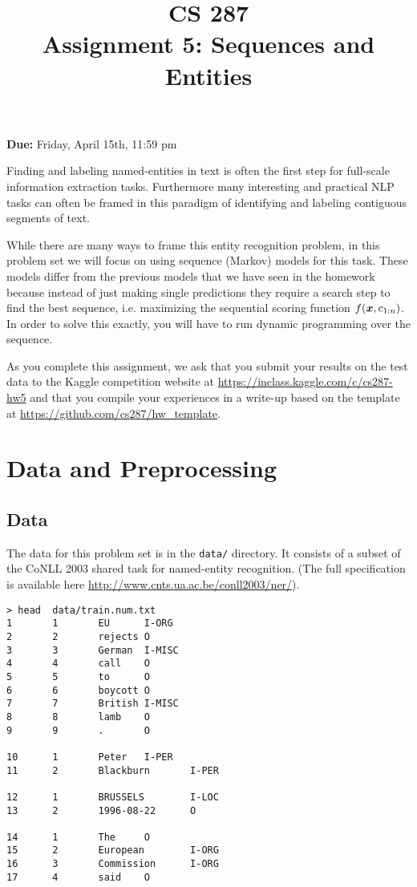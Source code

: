 \documentclass[11pt]{article}
\title{CS 287 \\ Assignment 5: Sequences and Entities }
\date{}
\begin{document}
\maketitle{}

\begin{center}
  \textbf{Due:} Friday, April 15th, 11:59 pm 
\end{center}


Finding and labeling named-entities in text is often the first step
for full-scale information extraction tasks. Furthermore many
interesting and practical NLP tasks can often be framed in this
paradigm of identifying and labeling contiguous segments of text. 

While there are many ways to frame this entity recognition problem, in
this problem set we will focus on using sequence (Markov) models for
this task. These models differ from the previous models that we have 
seen in the homework because instead of just making single predictions
they require a search step to find the best sequence, i.e. maximizing 
the sequential scoring function $f(\boldsymbol{x}, c_{1:n})$. In order to 
solve this exactly, you will have to run dynamic programming over the 
sequence. 

As you complete this assignment, we ask that you submit your results
on the test data to the Kaggle competition website at
\url{https://inclass.kaggle.com/c/cs287-hw5} and that you compile your
experiences in a write-up based on the template at
\url{https://github.com/cs287/hw_template}.

\section{Data and Preprocessing}

\subsection{Data}

The data for this problem set is in the \texttt{data/} 
directory. It consists of a subset of the CoNLL 2003 shared 
task for named-entity recognition. (The full specification 
is available here \url{http://www.cnts.ua.ac.be/conll2003/ner/}).


\begin{verbatim}
> head  data/train.num.txt
1       1       EU      I-ORG
2       2       rejects O
3       3       German  I-MISC
4       4       call    O
5       5       to      O
6       6       boycott O
7       7       British I-MISC
8       8       lamb    O
9       9       .       O

10      1       Peter   I-PER
11      2       Blackburn       I-PER

12      1       BRUSSELS        I-LOC
13      2       1996-08-22      O

14      1       The     O
15      2       European        I-ORG
16      3       Commission      I-ORG
17      4       said    O
\end{verbatim}
\end{document}
